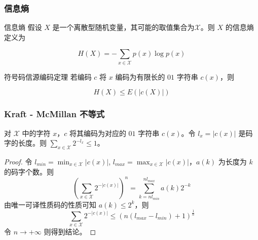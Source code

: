 \documentclass{beamer}
\begin{document}
\begin{frame}
    \frametitle{信息熵}

    \begin{block}{信息熵}
        假设 $X$ 是一个离散型随机变量，其可能的取值集合为$\mathcal{X}$。则 $X$ 的信息熵定义为

        \[H(X) = -\sum_{x\in \mathcal{X}}p(x)\log p(x)\]
    \end{block}

    \begin{block}{符号码信源编码定理}
        若编码 $c$ 将 $x$ 编码为有限长的 $01$ 字符串 $c(x)$，则

        \[H(X) \leq E(\lvert c(X)\rvert)\]
    \end{block}




\end{frame}

\begin{frame}
    \frametitle{Kraft - McMillan 不等式}

    对 $\mathcal{X}$ 中的字符 $x$，$c$ 将其编码为对应的 $01$ 字符串 $c(x)$。令 $l_x = \lvert c(x)\rvert$ 是码字的长度。则 $\sum_{x\in\mathcal{X}}2^{-l_x}\leq 1$。

    \begin{proof}
        令 $l_{min} = \min_{x\in\mathcal{X}}\lvert c(x)\rvert$, $l_{max} = \max_{x\in\mathcal{X}}\lvert c(x)\rvert$，$a(k)$ 为长度为 $k$ 的码字个数。则
        \[\left(\sum_{x\in\mathcal{X}}2^{-\lvert c(x)\rvert}\right)^n = \sum_{k = nl_{min}}^{nl_{max}} a(k)2^{-k}\]
        由唯一可译性质码的性质可知 $a(k)\leq 2^k$，则
        \[\sum_{x\in\mathcal{X}}2^{-\lvert c(x)\rvert} \leq (n(l_{max} - l_{min}) + 1)^{\frac{1}{n}}\]
        令 $n\to +\infty$ 则得到结论。
    \end{proof}

\end{frame}
\end{document}
